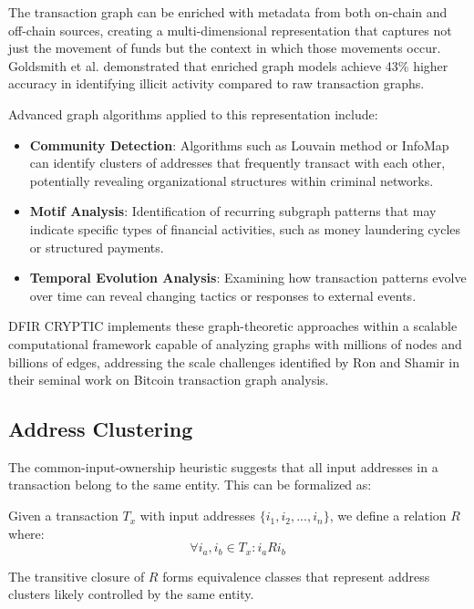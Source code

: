 \documentclass[conference]{IEEEtran}
\begin{document}
The transaction graph can be enriched with metadata from both on-chain and off-chain sources, creating a multi-dimensional representation that captures not just the movement of funds but the context in which those movements occur. Goldsmith et al. \cite{goldsmith2019} demonstrated that enriched graph models achieve 43\% higher accuracy in identifying illicit activity compared to raw transaction graphs.

Advanced graph algorithms applied to this representation include:

\begin{itemize}
    \item \textbf{Community Detection}: Algorithms such as Louvain method or InfoMap can identify clusters of addresses that frequently transact with each other, potentially revealing organizational structures within criminal networks.
    
    \item \textbf{Motif Analysis}: Identification of recurring subgraph patterns that may indicate specific types of financial activities, such as money laundering cycles or structured payments.
    
    \item \textbf{Temporal Evolution Analysis}: Examining how transaction patterns evolve over time can reveal changing tactics or responses to external events.
\end{itemize}

DFIR CRYPTIC implements these graph-theoretic approaches within a scalable computational framework capable of analyzing graphs with millions of nodes and billions of edges, addressing the scale challenges identified by Ron and Shamir \cite{ron2013} in their seminal work on Bitcoin transaction graph analysis.

\subsection{Address Clustering}

The common-input-ownership heuristic suggests that all input addresses in a transaction belong to the same entity. This can be formalized as:

Given a transaction $T_x$ with input addresses $\{i_1, i_2, ..., i_n\}$, we define a relation $R$ where:
\begin{equation}
\forall i_a, i_b \in T_x: i_a R i_b
\end{equation}

The transitive closure of $R$ forms equivalence classes that represent address clusters likely controlled by the same entity.
\end{document}
